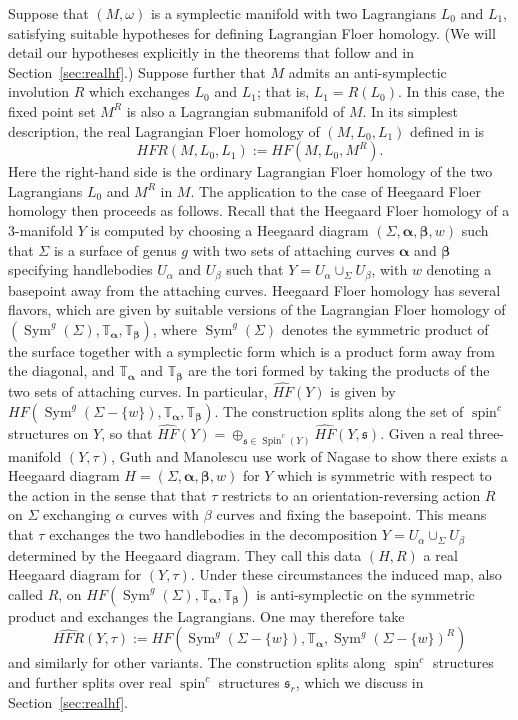 \documentclass[11pt,reqno]{amsart}
\theoremstyle{definition}
\theoremstyle{remark}
\newcommand{\T}{\mathbb{T}}
\DeclareMathOperator{\spin}{{spin}}
\DeclareMathOperator{\Spin}{{Spin}}
\DeclareMathOperator{\Sym}{{Sym}}
\newcommand{\alphas}{\boldsymbol \alpha}
\newcommand{\betas}{\boldsymbol \beta}
\newcommand{\HF}{\mathit{HF}}
\newcommand{\HFR}{\mathit{HFR}}
\newcommand{\HFRhat}{\widehat{\HFR}}
\newcommand\HFhat{\widehat{\HF}}
\numberwithin{equation}{section}
\begin{document}
Suppose that $(M, \omega)$ is a symplectic manifold with two Lagrangians $L_0$ and $L_1$, satisfying suitable hypotheses for defining Lagrangian Floer homology. (We will detail our hypotheses explicitly in the theorems that follow and in Section~\ref{sec:realhf}.) Suppose further that $M$ admits an anti-symplectic involution $R$ which exchanges $L_0$ and $L_1$; that is, $L_1=R(L_0)$. In this case, the fixed point set $M^R$ is also a Lagrangian submanifold of $M$. In its simplest description, the real Lagrangian Floer homology of $(M, L_0, L_1)$ defined in \cite{GM:real} is
%
\[ \HFR(M, L_0, L_1) := \HF(M, L_0, M^R). \]
%
Here the right-hand side is the ordinary Lagrangian Floer homology of the two Lagrangians $L_0$ and $M^R$ in $M$. The application to the case of Heegaard Floer homology then proceeds as follows. Recall that the Heegaard Floer homology of a 3-manifold $Y$ is computed by choosing a Heegaard diagram $(\Sigma, \alphas, \betas, w)$ such that $\Sigma$ is a surface of genus $g$ with two sets of attaching curves $\alphas$ and $\betas$ specifying handlebodies $U_{\alpha}$ and $U_{\beta}$ such that $Y= U_{\alpha}\cup_{\Sigma} U_{\beta}$, with $w$ denoting a basepoint away from the attaching curves. Heegaard Floer homology has several flavors, which are given by suitable versions of the Lagrangian Floer homology of $(\Sym^g(\Sigma), \T_{\alphas}, \T_{\betas})$, where $\Sym^g(\Sigma)$ denotes the symmetric product of the surface together with a symplectic form which is a product form away from the diagonal, and $\T_{\alphas}$ and $\T_{\betas}$ are the tori formed by taking the products of the two sets of attaching curves. In particular, $\HFhat(Y)$ is given by $\HF(\Sym^g(\Sigma - \{w\}), \T_{\alphas}, \T_{\betas})$. The construction splits along the set of $\spin^c$ structures on $Y$, so that $\HFhat(Y) = \oplus_{\mathfrak s \in \Spin^c(Y)} \HFhat(Y, \mathfrak s)$. Given a real three-manifold $(Y,\tau)$, Guth and Manolescu \cite[Proposition 3.2]{GM:real} use work of Nagase \cite[Proposition 2.4]{Nagase} to show there exists a Heegaard diagram $H = (\Sigma, \alphas, \betas, w)$ for $Y$ which is symmetric with respect to the action in the sense that that $\tau$ restricts to an orientation-reversing action $R$ on $\Sigma$ exchanging $\alpha$ curves with $\beta$ curves and fixing the basepoint. This means that $\tau$ exchanges the two handlebodies in the decomposition $Y = U_{\alpha} \cup_{\Sigma} U_{\beta}$ determined by the Heegaard diagram. They call this data $(H,R)$ a real Heegaard diagram for $(Y, \tau)$. Under these circumstances the induced map, also called $R$, on $\HF(\Sym^g(\Sigma), \T_{\alphas}, \T_{\betas})$ is anti-symplectic on the symmetric product and exchanges the Lagrangians. One may therefore take
%
\[ \HFRhat(Y, \tau) := HF(\Sym^g(\Sigma - \{w\}), \T_{\alphas}, \Sym^g(\Sigma - \{w\})^R)\]
%
and similarly for other variants. The construction splits along $\spin^c$ structures and further splits over real $\spin^c$ structures $\mathfrak s_r$, which we discuss in Section~\ref{sec:realhf}.
\end{document}
